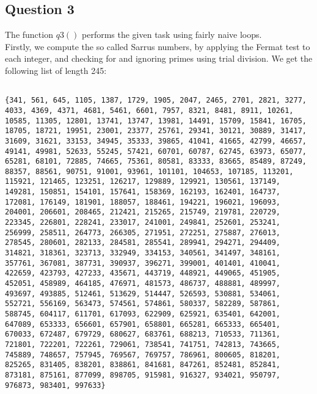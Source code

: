 \documentclass[10pt,a4paper]{report}
\begin{document}
\subsection*{Question 3}

The function $q3()$ performs the given task using fairly naive loops.\\

Firstly, we compute the so called Sarrus numbers, by applying the Fermat test to each integer, and checking for and ignoring primes using trial division. We get the following list of length 245:

\begin{lstlisting}[breaklines]

{341, 561, 645, 1105, 1387, 1729, 1905, 2047, 2465, 2701, 2821, 3277, 4033, 4369, 4371, 4681, 5461, 6601, 7957, 8321, 8481, 8911, 10261, 10585, 11305, 12801, 13741, 13747, 13981, 14491, 15709, 15841, 16705, 18705, 18721, 19951, 23001, 23377, 25761, 29341, 30121, 30889, 31417, 31609, 31621, 33153, 34945, 35333, 39865, 41041, 41665, 42799, 46657, 49141, 49981, 52633, 55245, 57421, 60701, 60787, 62745, 63973, 65077, 65281, 68101, 72885, 74665, 75361, 80581, 83333, 83665, 85489, 87249, 88357, 88561, 90751, 91001, 93961, 101101, 104653, 107185, 113201, 115921, 121465, 123251, 126217, 129889, 129921, 130561, 137149, 149281, 150851, 154101, 157641, 158369, 162193, 162401, 164737, 172081, 176149, 181901, 188057, 188461, 194221, 196021, 196093, 204001, 206601, 208465, 212421, 215265, 215749, 219781, 220729, 223345, 226801, 228241, 233017, 241001, 249841, 252601, 253241, 256999, 258511, 264773, 266305, 271951, 272251, 275887, 276013, 278545, 280601, 282133, 284581, 285541, 289941, 294271, 294409, 314821, 318361, 323713, 332949, 334153, 340561, 341497, 348161, 357761, 367081, 387731, 390937, 396271, 399001, 401401, 410041, 422659, 423793, 427233, 435671, 443719, 448921, 449065, 451905, 452051, 458989, 464185, 476971, 481573, 486737, 488881, 489997, 493697, 493885, 512461, 513629, 514447, 526593, 530881, 534061, 552721, 556169, 563473, 574561, 574861, 580337, 582289, 587861, 588745, 604117, 611701, 617093, 622909, 625921, 635401, 642001, 647089, 653333, 656601, 657901, 658801, 665281, 665333, 665401, 670033, 672487, 679729, 680627, 683761, 688213, 710533, 711361, 721801, 722201, 722261, 729061, 738541, 741751, 742813, 743665, 745889, 748657, 757945, 769567, 769757, 786961, 800605, 818201, 825265, 831405, 838201, 838861, 841681, 847261, 852481, 852841, 873181, 875161, 877099, 898705, 915981, 916327, 934021, 950797, 976873, 983401, 997633}

\end{lstlisting}
\end{document}
